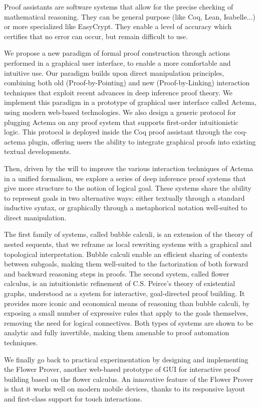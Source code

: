 Proof assistants are software systems that allow for the precise checking of
mathematical reasoning. They can be general purpose (like Coq, Lean,
Isabelle...) or more specialized like EasyCrypt. They enable a level of accuracy
which certifies that no error can occur, but remain difficult to use.

We propose a new paradigm of formal proof construction through actions performed
in a graphical user interface, to enable a more comfortable and intuitive use.
Our paradigm builds upon direct manipulation principles, combining both old
(Proof-by-Pointing) and new (Proof-by-Linking) interaction techniques that
exploit recent advances in deep inference proof theory. We implement this
paradigm in a prototype of graphical user interface called Actema, using modern
web-based technologies. We also design a generic protocol for plugging Actema on
any proof system that supports first-order intuitionistic logic. This protocol
is deployed inside the Coq proof assistant through the coq-actema plugin,
offering users the ability to integrate graphical proofs into existing textual
developments.

Then, driven by the will to improve the various interaction techniques of Actema
in a unified formalism, we explore a series of deep inference proof systems that
give more structure to the notion of logical goal. These systems share the
ability to represent goals in two alternative ways: either textually through a
standard inductive syntax, or graphically through a metaphorical notation
well-suited to direct manipulation.

The first family of systems, called bubble calculi, is an extension of the
theory of nested sequents, that we reframe as local rewriting systems with a
graphical and topological interpretation. Bubble calculi enable an efficient
sharing of contexts between subgoals, making them well-suited to the
factorization of both forward and backward reasoning steps in proofs. The second
system, called flower calculus, is an intuitionistic refinement of C.S. Peirce's
theory of existential graphs, understood as a system for interactive,
goal-directed proof building. It provides more iconic and economical means of
reasoning than bubble calculi, by exposing a small number of expressive rules
that apply to the goals themselves, removing the need for logical connectives.
Both types of systems are shown to be analytic and fully invertible, making them
amenable to proof automation techniques.

We finally go back to practical experimentation by designing and implementing
the Flower Prover, another web-based prototype of GUI for interactive proof
building based on the flower calculus. An innovative feature of the Flower
Prover is that it works well on modern mobile devices, thanks to its responsive
layout and first-class support for touch interactions.